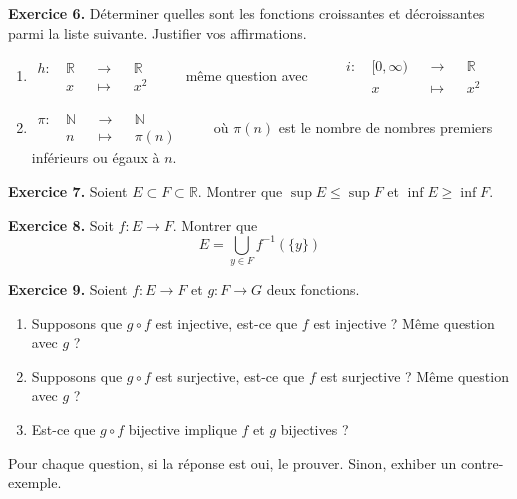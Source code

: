 \documentclass[a4paper, 10pt]{report}
\begin{document}
	\vspace{5mm}
	\noindent
	\textbf{Exercice 6.} Déterminer quelles sont les fonctions
	croissantes et décroissantes parmi la liste suivante.
	Justifier vos affirmations.
	\begin{enumerate}[label=(\roman*)]
		\item $\begin{aligned}
			h :\ & \mathbb{R} &&\to &&\mathbb{R}\\
			&x &&\mapsto &&x^2
		\end{aligned} \qquad$ même question avec
		$\qquad \begin{aligned}
			i :\ & [0, \infty) &&\to &&\mathbb{R}\\
			&x &&\mapsto &&x^2
		\end{aligned}$
		\vspace{10pt}
		\item $\begin{aligned}
			\pi :\ & \mathbb{N} &&\to &&\mathbb{N}\\
			&n &&\mapsto &&\pi(n)
		\end{aligned} \qquad$ où $\pi(n)$ est le nombre de nombres
		premiers inférieurs ou égaux à $n$.
	\end{enumerate}
	
	\vspace{5mm}
	\noindent
	\textbf{Exercice 7.} Soient $E \subset F \subset \mathbb{R}$.
	Montrer que $\sup{E} \leq \sup{F}$ et $\inf{E} \geq \inf{F}$.
		
	\vspace{5mm}
	\noindent
	\textbf{Exercice 8.} Soit $f : E \to F$. Montrer que
	\[
		E = \bigcup\limits_{y \in F} f^{-1}(\{y\})
	\]
	
	\vspace{5mm}
	\noindent
	\textbf{Exercice 9.} Soient $f : E \to F$ et $g : F \to G$ deux
	fonctions.
	\begin{enumerate}[label=(\roman*)]
		\item Supposons que $g \circ f$ est injective, est-ce que
		$f$ est injective ? Même question avec $g$ ?
		\item Supposons que $g \circ f$ est surjective, est-ce que
		$f$ est surjective ? Même question avec $g$ ?
		\item Est-ce que $g \circ f$ bijective implique $f$ et $g$
		bijectives ?
	\end{enumerate}	
	Pour chaque question, si la réponse est oui, le prouver.
	Sinon, exhiber un contre-exemple.
	
	\fancyhf{}
	\renewcommand{\headrule}
	{\rule{\textwidth}{0pt}}
	
\end{document}
